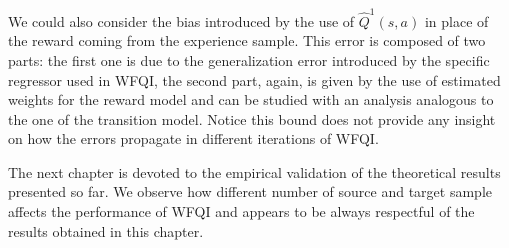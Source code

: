       \noindent We could also consider the bias introduced by the use of $\hat{Q}^{1}(s,a)$ in place of the reward coming from the
      experience sample. This error is composed of two parts: the first one is due to the generalization error introduced
      by the specific regressor used in WFQI, the second part, again, is given by the use of estimated weights for the
      reward model and can be studied with an analysis analogous to the one of the transition model. Notice this
      bound does not provide any insight on how the errors propagate in different iterations of WFQI.\newline

      \noindent The next chapter is devoted to the empirical validation of the theoretical results presented
      so far. We observe how different number of source and target sample affects the performance of WFQI and
      appears to be always respectful of the results obtained in this chapter.
